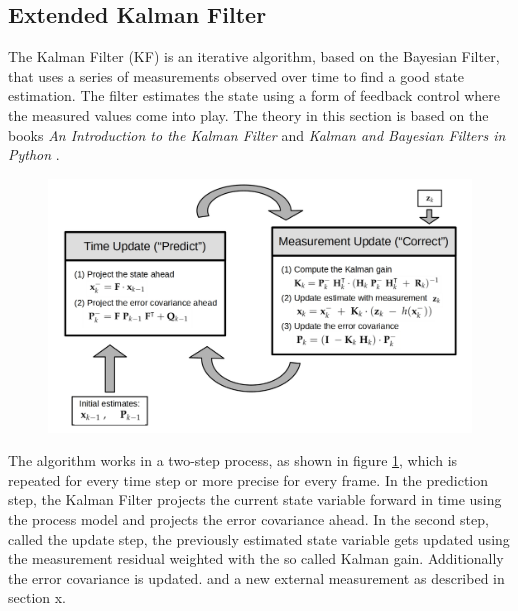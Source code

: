 \subsection{Extended Kalman Filter}\label{sec:EKF}
The Kalman Filter (KF) is an iterative algorithm, based on the Bayesian Filter, that uses a series of measurements observed over time to find a good state estimation. The filter estimates the state using a form of feedback control where the measured values come into play. The theory in this section is based on the books \textit{An Introduction to the Kalman Filter} \cite{kalmanbook} and \textit{Kalman and Bayesian Filters in Python} \cite{filterpybook}.

\begin{figure}[h]
	\centering
	\includegraphics[width=1.0\textwidth]{./images/kalman.jpg}
	\label{fig:kalmanprocess}
\end{figure}
The algorithm works in a two-step process, as shown in figure \ref{fig:kalmanprocess}, which is repeated for every time step or more precise for every frame. In the prediction step, the Kalman Filter projects the current state variable forward in time using the process model and projects the error covariance ahead. In the second step, called the update step, the previously estimated state variable gets updated using the measurement residual weighted with the so called Kalman gain. Additionally the error covariance is updated.
and a new external measurement as described in section x.

